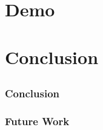 \documentclass{beamer}
\begin{document}
\section{Demo}
\subsection{}

\begin{frame}

\end{frame}

\section{Conclusion}
\subsection{}

\begin{frame}
\frametitle{Conclusion}

\end{frame}

\begin{frame}
\frametitle{Future Work}

\end{frame}
\end{document}
